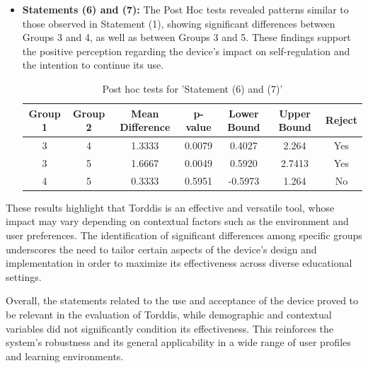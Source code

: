 \begin{itemize}
                    \item \textbf{Statements (6) and (7):} The Post Hoc tests revealed patterns similar to those observed in Statement (1), showing significant differences between Groups 3 and 4, as well as between Groups 3 and 5. These findings support the positive perception regarding the device’s impact on self-regulation and the intention to continue its use.
                    
                    \begin{table}[h]
                        \centering
                        \caption{Post hoc tests for 'Statement (6) and (7)'}
                        \footnotesize\setlength{\tabcolsep}{3pt}\begin{tabularx}{\linewidth}{ccccccc}
                            \hline
                            \textbf{Group 1} & \textbf{Group 2} & \textbf{Mean Difference} & \textbf{p-value} & \textbf{Lower Bound} & \textbf{Upper Bound} & \textbf{Reject} \\
                            \hline
                            3 & 4 & 1.3333 & 0.0079 & 0.4027 & 2.264 & Yes \\
                            3 & 5 & 1.6667 & 0.0049 & 0.5920 & 2.7413 & Yes \\
                            4 & 5 & 0.3333 & 0.5951 & -0.5973 & 1.264 & No \\
                            \hline
                        \end{tabularx}
                        \label{table:posthoc_6y7}
                    \end{table}
                    
                \end{itemize}
                
                These results highlight that Torddis is an effective and versatile tool, whose impact may vary depending on contextual factors such as the environment and user preferences. The identification of significant differences among specific groups underscores the need to tailor certain aspects of the device’s design and implementation in order to maximize its effectiveness across diverse educational settings.
                
                Overall, the statements related to the use and acceptance of the device proved to be relevant in the evaluation of Torddis, while demographic and contextual variables did not significantly condition its effectiveness. This reinforces the system’s robustness and its general applicability in a wide range of user profiles and learning environments.
                
